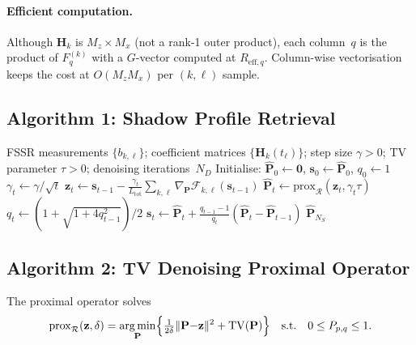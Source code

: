 \documentclass[11pt,a4paper]{article}
\newcommand{\TV}{\mathrm{TV}}
\DeclareMathOperator*{\argmin}{arg\,min}
\begin{document}
\paragraph{Efficient computation.}
Although $\mathbf{H}_k$ is $M_z\times M_x$ (not a rank-1 outer
product), each column~$q$ is the product of $F_q^{(k)}$ with a
$G$-vector computed at $R_{\mathrm{eff},q}$.  Column-wise
vectorisation keeps the cost at
$O(M_z M_x)$ per $(k,\ell)$ sample.

\subsection{Algorithm 1: Shadow Profile Retrieval}
\label{sec:alg1}

\begin{algorithm}[H]
\caption{Gradient descent with TV denoising for shadow profile
retrieval}
\label{alg:profile_retrieval}
\begin{algorithmic}[1]
\Require FSSR measurements $\{b_{k,\ell}\}$; coefficient matrices
$\{\mathbf{H}_k(t_\ell)\}$; step size $\gamma>0$;
TV parameter $\tau>0$; denoising iterations~$N_D$
\State Initialise: $\hat{\mathbf{P}}_0\leftarrow\mathbf{0}$,
$\mathbf{s}_0\leftarrow\hat{\mathbf{P}}_0$, $q_0\leftarrow 1$
  \State $\gamma_t \leftarrow \gamma/\sqrt{t}$
  \State $\mathbf{z}_t \leftarrow \mathbf{s}_{t-1}
    - \frac{\gamma_t}{L_{\mathrm{tot}}}
    \sum_{k,\ell}\nabla_{\mathbf{P}}\mathcal{F}_{k,\ell}
    (\mathbf{s}_{t-1})$
  \State $\hat{\mathbf{P}}_t \leftarrow
    \mathrm{prox}_{\mathcal{R}}(\mathbf{z}_t,\gamma_t\tau)$
  \State $q_t \leftarrow (1{+}\sqrt{1{+}4q_{t-1}^2})/2$
  \State $\mathbf{s}_t \leftarrow \hat{\mathbf{P}}_t
    + \frac{q_{t-1}-1}{q_t}
    (\hat{\mathbf{P}}_t{-}\hat{\mathbf{P}}_{t-1})$
\EndFor
\State \Return $\hat{\mathbf{P}}_{N_S}$
\end{algorithmic}
\end{algorithm}

\subsection{Algorithm 2: TV Denoising Proximal Operator}
\label{sec:alg2}

The proximal operator solves
\begin{equation}
  \mathrm{prox}_{\mathcal{R}}(\mathbf{z},\delta)
  = \argmin_{\mathbf{P}}\Bigl\{
  \tfrac{1}{2\delta}\|\mathbf{P}{-}\mathbf{z}\|^2
  + \TV(\mathbf{P})\Bigr\}
  \quad\text{s.t.}\quad 0\le P_{p,q}\le 1.
  \label{eq:prox_problem}
\end{equation}
\end{document}
